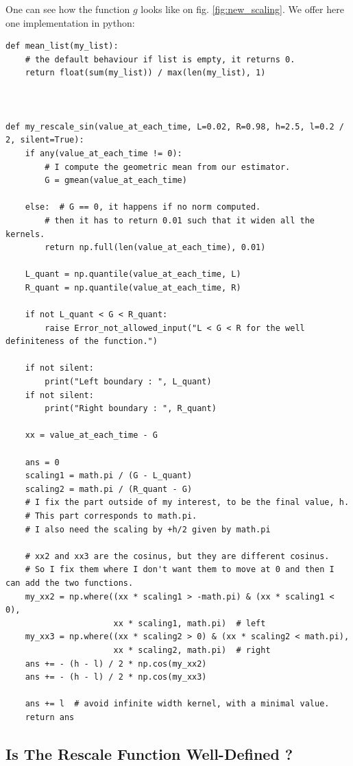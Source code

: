 One can see how the function $g$ looks like on fig. \ref{fig:new_scaling}. We offer here one implementation in python:


\begin{Verbatim}[fontsize=\footnotesize]
def mean_list(my_list):
    # the default behaviour if list is empty, it returns 0.
    return float(sum(my_list)) / max(len(my_list), 1)
    
    

def my_rescale_sin(value_at_each_time, L=0.02, R=0.98, h=2.5, l=0.2 / 2, silent=True):
    if any(value_at_each_time != 0):
        # I compute the geometric mean from our estimator.
        G = gmean(value_at_each_time)

    else:  # G == 0, it happens if no norm computed.
        # then it has to return 0.01 such that it widen all the kernels.
        return np.full(len(value_at_each_time), 0.01)

    L_quant = np.quantile(value_at_each_time, L)
    R_quant = np.quantile(value_at_each_time, R)

    if not L_quant < G < R_quant:
        raise Error_not_allowed_input("L < G < R for the well definiteness of the function.")

    if not silent:
        print("Left boundary : ", L_quant)
    if not silent:
        print("Right boundary : ", R_quant)

    xx = value_at_each_time - G

    ans = 0
    scaling1 = math.pi / (G - L_quant)
    scaling2 = math.pi / (R_quant - G)
    # I fix the part outside of my interest, to be the final value, h.
    # This part corresponds to math.pi.
    # I also need the scaling by +h/2 given by math.pi

    # xx2 and xx3 are the cosinus, but they are different cosinus.
    # So I fix them where I don't want them to move at 0 and then I can add the two functions.
    my_xx2 = np.where((xx * scaling1 > -math.pi) & (xx * scaling1 < 0),
                      xx * scaling1, math.pi)  # left
    my_xx3 = np.where((xx * scaling2 > 0) & (xx * scaling2 < math.pi),
                      xx * scaling2, math.pi)  # right
    ans += - (h - l) / 2 * np.cos(my_xx2)
    ans += - (h - l) / 2 * np.cos(my_xx3)

    ans += l  # avoid infinite width kernel, with a minimal value.
    return ans
\end{Verbatim}



\subsection{Is The Rescale Function Well-Defined ?}
\label{subsection:self-defin}

